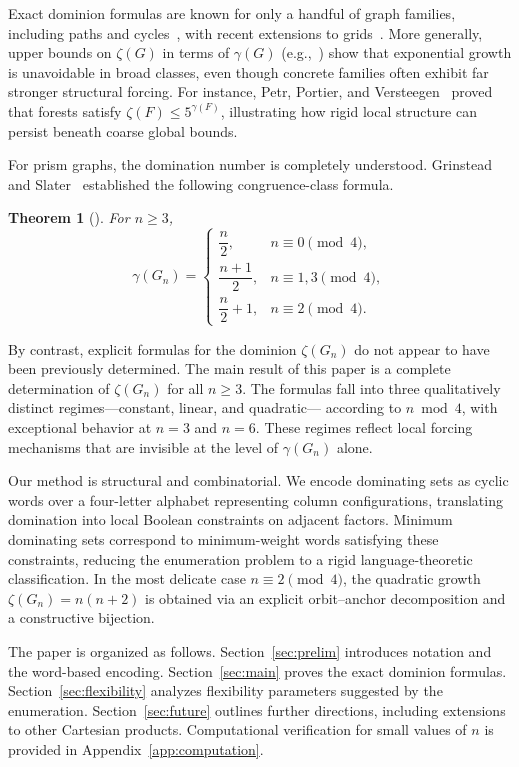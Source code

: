\documentclass[11pt]{article}
\theoremstyle{plain}
\newtheorem{theorem}{Theorem}[section]
\theoremstyle{definition}
\theoremstyle{remark}
\begin{document}
Exact dominion formulas are known for only a handful of graph families, including paths
and cycles~\cite{allagan-bobga-2021}, with recent extensions to grids~\cite{su-allagan-2024}.
More generally, upper bounds on $\zeta(G)$ in terms of $\gamma(G)$
(e.g.,~\cite{godbole-jamieson-jamieson-2014,connolly-etal-2016}) show that exponential growth
is unavoidable in broad classes, even though concrete families often exhibit far stronger
structural forcing.  For instance, Petr, Portier, and Versteegen~\cite{petr-portier-versteegen-2024}
proved that forests satisfy $\zeta(F)\le 5^{\gamma(F)}$, illustrating how rigid local structure
can persist beneath coarse global bounds.

For prism graphs, the domination number is completely understood.
Grinstead and Slater~\cite{grinstead-slater-1991} established the following congruence-class
formula.

\begin{theorem}[{\cite{grinstead-slater-1991}}]\label{thm:gamma-prism}
For $n\ge 3$,
\[
\gamma(G_n)=
\begin{cases}
\dfrac{n}{2}, & n\equiv 0\pmod{4},\\[6pt]
\dfrac{n+1}{2}, & n\equiv 1,3\pmod{4},\\[6pt]
\dfrac{n}{2}+1, & n\equiv 2\pmod{4}.
\end{cases}
\]
\end{theorem}

By contrast, explicit formulas for the dominion $\zeta(G_n)$ do not appear to have been
previously determined.
The main result of this paper is a complete determination of $\zeta(G_n)$ for all $n\ge 3$.
The formulas fall into three qualitatively distinct regimes—constant, linear, and quadratic—
according to $n\bmod 4$, with exceptional behavior at $n=3$ and $n=6$.
These regimes reflect local forcing mechanisms that are invisible at the level of
$\gamma(G_n)$ alone.

Our method is structural and combinatorial.
We encode dominating sets as cyclic words over a four-letter alphabet representing column
configurations, translating domination into local Boolean constraints on adjacent factors.
Minimum dominating sets correspond to minimum-weight words satisfying these constraints,
reducing the enumeration problem to a rigid language-theoretic classification.
In the most delicate case $n\equiv 2\pmod{4}$, the quadratic growth
$\zeta(G_n)=n(n+2)$ is obtained via an explicit orbit--anchor decomposition and a
constructive bijection.

The paper is organized as follows.
Section~\ref{sec:prelim} introduces notation and the word-based encoding.
Section~\ref{sec:main} proves the exact dominion formulas.
Section~\ref{sec:flexibility} analyzes flexibility parameters suggested by the enumeration.
Section~\ref{sec:future} outlines further directions, including extensions to other
Cartesian products.
Computational verification for small values of $n$ is provided in
Appendix~\ref{app:computation}.
\end{document}
